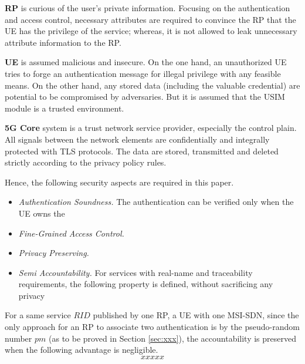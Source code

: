 \textbf{RP} is curious of the user's private information. Focusing on the authentication and access control, necessary attributes are required to convince the RP that the UE has the privilege of the service; whereas, it is not allowed to leak unnecessary attribute information to the RP. 

\textbf{UE} is assumed malicious and insecure. On the one hand, an unauthorized UE tries to forge an authentication message for illegal privilege with any feasible means. On the other hand, any stored data (including the valuable credential) are potential to be compromised by adversaries. But it is assumed that the USIM module is a trusted environment.

\textbf{5G Core} system is a trust network service provider, especially the control plain. All signals between the network elements are confidentially and integrally protected with TLS protocols. The data are stored, transmitted and deleted strictly according to the privacy policy rules.

Hence, the following security aspects are required in this paper.

\begin{itemize}
	\item \textit{Authentication Soundness.} 
	The authentication can be verified only when the UE owns the 
	\item \textit{Fine-Grained Access Control.}
	\item \textit{Privacy Preserving.} 
	\item \textit{Semi Accountability.} For services with real-name and traceability requirements, the following property is defined, without sacrificing any privacy 
\end{itemize}

\begin{definition}
	For a same service $RID$ published by one RP, a UE with one MSI-SDN, since the only approach for an RP to associate two authentication is by the pseudo-random number $pm$ (as to be proved in Section \ref{sec:xxx}), the accountability is preserved when the following advantage is negligible.
	$$xxxxx$$
\end{definition}

